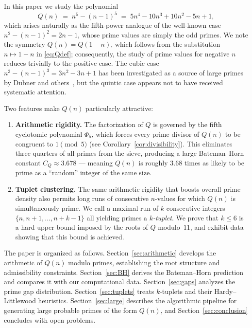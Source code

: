 \documentclass[11pt,a4paper]{article}
\theoremstyle{plain}
\theoremstyle{definition}
\theoremstyle{remark}
\begin{document}
In this paper we study the polynomial
\begin{equation}\label{eq:Qdef}
Q(n) \;=\; n^5 - (n-1)^5 \;=\; 5n^4 - 10n^3 + 10n^2 - 5n + 1,
\end{equation}
which arises naturally as the fifth-power analogue of the well-known case $n^2 - (n-1)^2 = 2n - 1$, whose prime values are simply the odd primes. We note the symmetry $Q(n) = Q(1-n)$, which follows from the substitution $n \mapsto 1-n$ in \eqref{eq:Qdef}; consequently, the study of prime values for negative $n$ reduces trivially to the positive case. The cubic case $n^3-(n-1)^3 = 3n^2-3n+1$ has been investigated as a source of large primes by Dubner and others~\cite{dubner2002}, but the quintic case appears not to have received systematic attention.

Two features make $Q(n)$ particularly attractive:
\begin{enumerate}[label=(\roman*)]
\item \textbf{Arithmetic rigidity.} The factorization of $Q$ is governed by the fifth cyclotomic polynomial $\Phi_5$, which forces every prime divisor of $Q(n)$ to be congruent to $1 \pmod{5}$ (see Corollary~\ref{cor:divisibility}). This eliminates three-quarters of all primes from the sieve, producing a large Bateman--Horn constant $C_Q \approx 3.678$ --- meaning $Q(n)$ is roughly $3.68$ times as likely to be prime as a ``random'' integer of the same size.

\item \textbf{Tuplet clustering.} The same arithmetic rigidity that boosts overall prime density also permits long runs of consecutive $n$-values for which $Q(n)$ is simultaneously prime. We call a maximal run of $k$ consecutive integers $\{n, n{+}1, \ldots, n{+}k{-}1\}$ all yielding primes a \emph{$k$-tuplet}. We prove that $k \le 6$ is a hard upper bound imposed by the roots of $Q$ modulo~$11$, and exhibit data showing that this bound is achieved.
\end{enumerate}

The paper is organized as follows. Section~\ref{sec:arithmetic} develops the arithmetic of $Q(n)$ modulo primes, establishing the root structure and admissibility constraints. Section~\ref{sec:BH} derives the Bateman--Horn prediction and compares it with our computational data. Section~\ref{sec:gaps} analyzes the prime gap distribution. Section~\ref{sec:tuplets} treats $k$-tuplets and their Hardy--Littlewood heuristics. Section~\ref{sec:large} describes the algorithmic pipeline for generating large probable primes of the form $Q(n)$, and Section~\ref{sec:conclusion} concludes with open problems.
\end{document}
